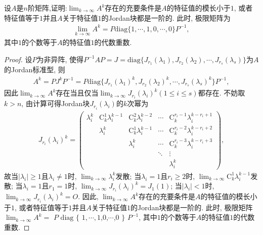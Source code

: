 \documentclass[../../main.tex]{subfiles}
\begin{document}
\begin{proposition}\label{proposition:矩阵方幂极限存在的充要条件及极限矩阵}
设$A$是$n$阶矩阵,证明:$\lim_{k \to \infty} A^k$存在的充要条件是$A$的特征值的模长小于$1$, 或者特征值等于$1$并且$A$关于特征值$1$的Jordan块都是一阶的. 此时, 极限矩阵为
\begin{align*}
\lim_{k \to \infty} A^k = P\mathrm{diag}\{1,\cdots,1,0,\cdots,0\}P^{-1},
\end{align*}
其中$1$的个数等于$A$的特征值$1$的代数重数.
\end{proposition}
\begin{proof}
设$P$为非异阵, 使得$P^{-1}AP = J=\mathrm{diag}\{J_{r_1}(\lambda_1),J_{r_2}(\lambda_2),\cdots,J_{r_s}(\lambda_s)\}$为$A$的Jordan标准型, 则
\begin{align*}
A^k = PJ^kP^{-1}=P\mathrm{diag}\{J_{r_1}(\lambda_1)^k,J_{r_2}(\lambda_2)^k,\cdots,J_{r_s}(\lambda_s)^k\}P^{-1},
\end{align*}
因此$\lim_{k \to \infty} A^k$存在当且仅当$\lim_{k \to \infty} J_{r_i}(\lambda_i)^k (1\leqslant i \leqslant s)$都存在. 不妨取$k > n$, 由计算可得Jordan块$J_{r_i}(\lambda_i)$的$k$次幂为
\begin{align*}
J_{r_i}(\lambda_i)^k = 
\begin{pmatrix}
\lambda_i^k & \mathrm{C}_{k}^{1}\lambda_i^{k - 1} & \mathrm{C}_{k}^{2}\lambda_i^{k - 2} & \cdots & \mathrm{C}_{k}^{r_i - 1}\lambda_i^{k - r_i + 1} \\
 & \lambda_i^k & \mathrm{C}_{k}^{1}\lambda_i^{k - 1} & \cdots & \mathrm{C}_{k}^{r_i - 2}\lambda_i^{k - r_i + 2} \\
 & & \lambda_i^k & \cdots & \mathrm{C}_{k}^{r_i - 3}\lambda_i^{k - r_i + 3} \\
 & & & \ddots & \vdots \\
 & & & & \lambda_i^k
\end{pmatrix},
\end{align*}
故当$|\lambda_i|\geqslant 1$且$\lambda_i\neq 1$时, $\lim_{k \to \infty} \lambda_i^k$发散; 当$\lambda_i = 1$且$r_i\geqslant 2$时, $\lim_{k \to \infty} \mathrm{C}_{k}^{1}\lambda_i^{k - 1}$发散; 当$\lambda_i = 1$且$r_1 = 1$时, $\lim_{k \to \infty} J_{r_i}(\lambda_i)^k = J_1(1)$; 当$|\lambda_i| < 1$时, $\lim_{k \to \infty} J_{r_i}(\lambda_i)^k = O$. 因此, $\lim_{k \to \infty} A^k$存在的充要条件是$A$的特征值的模长小于$1$, 或者特征值等于$1$并且$A$关于特征值$1$的Jordan块都是一阶的. 此时, 极限矩阵$\lim_{k \to \infty} A^k = $ $P$ $\mathrm{diag}$ $\{$ $1,\cdots,1$,$0$,$\cdots$,$0$ $\}$ $P^{-1}$, 其中$1$的个数等于$A$的特征值$1$的代数重数.
\end{proof}
\end{document}
